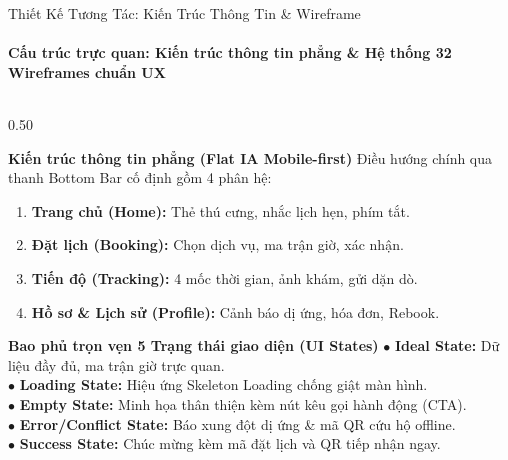 \begin{frame}{Thiết Kế Tương Tác: Kiến Trúc Thông Tin \& Wireframe}
  \framesubtitle{\color{PetcareSecondary}\textbf{Cấu trúc trực quan: Kiến trúc thông tin phẳng \& Hệ thống 32 Wireframes chuẩn UX}}

  \begin{columns}[T]
    \begin{column}{0.50\textwidth}
      \begin{block}{\footnotesize \textbf{Kiến trúc thông tin phẳng (Flat IA Mobile-first)}}
        \scriptsize
        Điều hướng chính qua thanh Bottom Bar cố định gồm 4 phân hệ:
        \begin{enumerate}
          \tiny
          \item \textbf{Trang chủ (Home):} Thẻ thú cưng, nhắc lịch hẹn, phím tắt.
          \item \textbf{Đặt lịch (Booking):} Chọn dịch vụ, ma trận giờ, xác nhận.
          \item \textbf{Tiến độ (Tracking):} 4 mốc thời gian, ảnh khám, gửi dặn dò.
          \item \textbf{Hồ sơ \& Lịch sử (Profile):} Cảnh báo dị ứng, hóa đơn, Rebook.
        \end{enumerate}
      \end{block}

      \vspace{-1mm}
      \begin{exampleblock}{\footnotesize \textbf{Bao phủ trọn vẹn 5 Trạng thái giao diện (UI States)}}
        \tiny
        $\bullet$ \textbf{Ideal State:} Dữ liệu đầy đủ, ma trận giờ trực quan.\\
        $\bullet$ \textbf{Loading State:} Hiệu ứng Skeleton Loading chống giật màn hình.\\
        $\bullet$ \textbf{Empty State:} Minh họa thân thiện kèm nút kêu gọi hành động (CTA).\\
        $\bullet$ \textbf{Error/Conflict State:} Báo xung đột dị ứng \& mã QR cứu hộ offline.\\
        $\bullet$ \textbf{Success State:} Chúc mừng kèm mã đặt lịch và QR tiếp nhận ngay.
      \end{exampleblock}
    \end{column}


\end{columns}
\end{frame}
